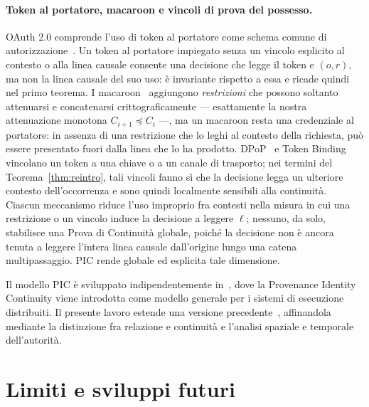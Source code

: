 \documentclass[11pt]{article}
\begin{document}
\paragraph{Token al portatore, macaroon e vincoli di prova del possesso.}
OAuth 2.0 comprende l'uso di token al portatore come schema comune di
autorizzazione~\cite{hardt2012oauth,jones2012bearer}. Un token al portatore
impiegato senza un vincolo esplicito al contesto o alla linea causale consente
una decisione che legge il token e $(o,r)$, ma non la linea causale del suo uso:
è invariante rispetto a essa e ricade quindi nel primo teorema. I
macaroon~\cite{birgisson2014macaroons} aggiungono \emph{restrizioni} che possono
soltanto attenuarsi e concatenarsi crittograficamente --- esattamente la nostra
attenuazione monotona $C_{i+1}\preceq C_i$ ---, ma un macaroon resta una
credenziale al portatore: in assenza di una restrizione che lo leghi al contesto
della richiesta, può essere presentato fuori dalla linea che lo ha prodotto.
DPoP~\cite{fett2023dpop} e Token Binding~\cite{popov2018token} vincolano un token
a una chiave o a un canale di trasporto; nei termini del
Teorema~\ref{thm:reintro}, tali vincoli fanno sì che la decisione legga un
ulteriore contesto dell'occorrenza e sono quindi localmente sensibili alla
continuità. Ciascun meccanismo riduce l'uso improprio fra contesti nella misura
in cui una restrizione o un vincolo induce la decisione a leggere $\ell$;
nessuno, da solo, stabilisce una Prova di Continuità globale, poiché la decisione
non è ancora tenuta a leggere l'intera linea causale dall'origine lungo una
catena multipassaggio. PIC rende globale ed esplicita tale dimensione.

Il modello PIC è sviluppato indipendentemente in~\cite{gallo2025pic}, dove la
Provenance Identity Continuity viene introdotta come modello generale per i
sistemi di esecuzione distribuiti. Il presente lavoro estende una versione
precedente~\cite{gallo2025apm}, affinandola mediante la distinzione fra relazione
e continuità e l'analisi spaziale e temporale dell'autorità.

\section{Limiti e sviluppi futuri}
\end{document}
